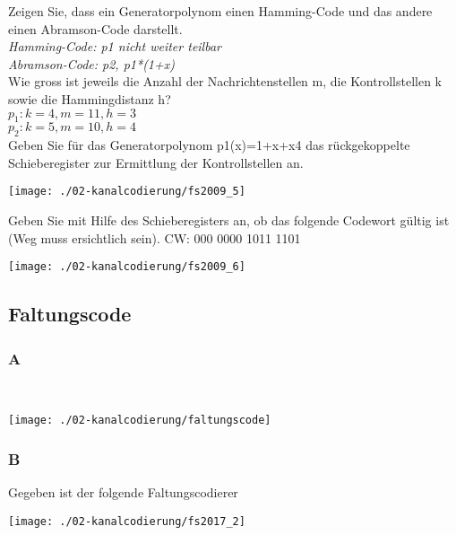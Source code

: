 Zeigen Sie, dass ein Generatorpolynom einen Hamming-Code und das andere einen Abramson-Code darstellt.\\
\textit{Hamming-Code: p1 nicht weiter teilbar}\\
\textit{Abramson-Code: p2, p1*(1+x)}\\

Wie gross ist jeweils die Anzahl der Nachrichtenstellen m, die Kontrollstellen k sowie die Hammingdistanz h?\\
$p_1: k=4, m=11, h=3$\\
$p_2: k=5, m=10, h=4$\\

Geben Sie für das Generatorpolynom p1(x)=1+x+x4 das rückgekoppelte Schieberegister zur Ermittlung der Kontrollstellen an.
\begin{center}
    \vspace{-8pt}
    \texttt{[image: ./02-kanalcodierung/fs2009\_5]}
    \vspace{-8pt}
\end{center}

Geben Sie mit Hilfe des Schieberegisters an, ob das folgende Codewort gültig ist (Weg muss ersichtlich sein). CW: 000 0000 1011 1101
\begin{center}
    \vspace{-8pt}
    \texttt{[image: ./02-kanalcodierung/fs2009\_6]}
    \vspace{-8pt}
\end{center}

\columnbreak

\subsection{Faltungscode}
\subsubsection{A}\mbox{}\\
\begin{center}
    \vspace{-8pt}
    \texttt{[image: ./02-kanalcodierung/faltungscode]}
    \vspace{-8pt}
\end{center}

\subsubsection{B}
Gegeben ist der folgende Faltungscodierer
\begin{center}
    \vspace{-8pt}
    \texttt{[image: ./02-kanalcodierung/fs2017\_2]}
    \vspace{-8pt}
\end{center}

